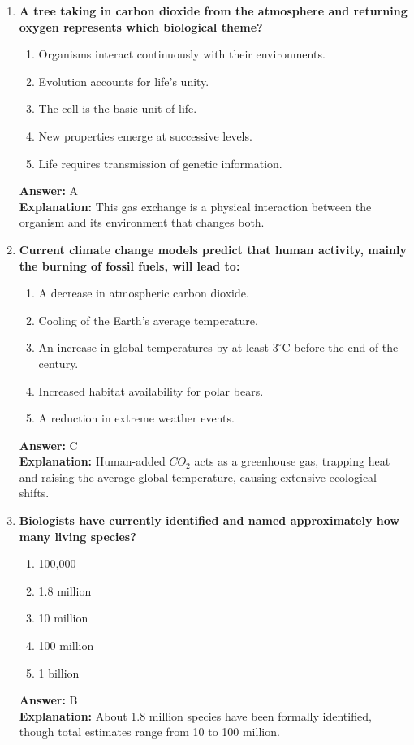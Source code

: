 \documentclass[11pt, a4paper]{article}
\begin{document}
\begin{enumerate}
\item \textbf{A tree taking in carbon dioxide from the atmosphere and returning oxygen represents which biological theme?}
\begin{enumerate}[label=\Alph*.]
    \item Organisms interact continuously with their environments.
    \item Evolution accounts for life's unity.
    \item The cell is the basic unit of life.
    \item New properties emerge at successive levels.
    \item Life requires transmission of genetic information.
\end{enumerate}
\textbf{Answer:} A \\
\textbf{Explanation:} This gas exchange is a physical interaction between the organism and its environment that changes both.

\item \textbf{Current climate change models predict that human activity, mainly the burning of fossil fuels, will lead to:}
\begin{enumerate}[label=\Alph*.]
    \item A decrease in atmospheric carbon dioxide.
    \item Cooling of the Earth's average temperature.
    \item An increase in global temperatures by at least $3^\circ\text{C}$ before the end of the century.
    \item Increased habitat availability for polar bears.
    \item A reduction in extreme weather events.
\end{enumerate}
\textbf{Answer:} C \\
\textbf{Explanation:} Human-added $CO_2$ acts as a greenhouse gas, trapping heat and raising the average global temperature, causing extensive ecological shifts.

\item \textbf{Biologists have currently identified and named approximately how many living species?}
\begin{enumerate}[label=\Alph*.]
    \item 100,000
    \item 1.8 million
    \item 10 million
    \item 100 million
    \item 1 billion
\end{enumerate}
\textbf{Answer:} B \\
\textbf{Explanation:} About 1.8 million species have been formally identified, though total estimates range from 10 to 100 million.


\end{enumerate}
\end{document}
